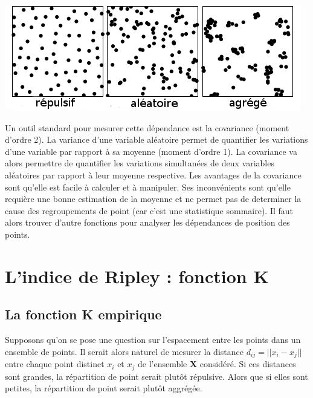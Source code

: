 \documentclass[french,12pt,a4paper]{report}
\begin{document}
\begin{center} \includegraphics[scale=0.8]{images/repartition.png} \end{center}

Un outil standard pour mesurer cette dépendance est la covariance (moment d'ordre 2). La variance d'une variable aléatoire permet de quantifier les variations d’une variable par rapport à sa moyenne (moment d'ordre 1). La covariance va alors permettre de quantifier les variations simultanées de deux variables aléatoires par rapport à leur moyenne respective.
Les avantages de la covariance sont qu'elle est facile à calculer et à manipuler. Ses inconvénients sont qu'elle requière une bonne estimation de la moyenne  et ne permet pas de determiner la cause des regroupements de point (car c'est une statistique sommaire).
Il faut alors trouver d'autre fonctions pour analyser les dépendances de position des points.\\

\section{L'indice de Ripley : fonction K}

\subsection{La fonction K empirique}
Supposons qu'on se pose une question sur l'espacement entre les points dans un ensemble de points. Il serait alors naturel de mesurer la distance \begin{math} d_{ij} = ||x_i-x_j||\end{math} entre chaque point distinct \begin{math} x_i \end{math} et \begin{math} x_j \end{math} de l'ensemble \textbf{X} considéré. Si ces distances sont grandes, la répartition de point serait plutôt répulsive. Alors que si elles sont petites, la répartition de point serait plutôt aggrégée.\\
\end{document}
